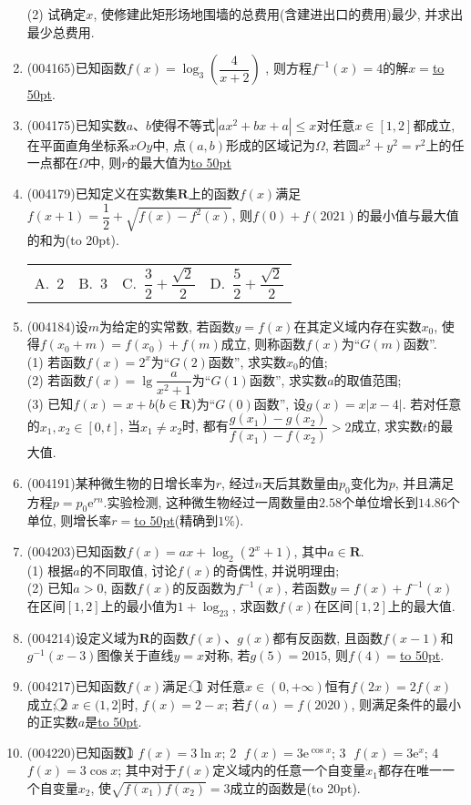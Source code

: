 \documentclass[10pt,a4paper]{article}
\newcommand{\blank}[1]{\underline{\hbox to #1pt{}}}
\newcommand{\bracket}[1]{(\hbox to #1pt{})}
\newcommand{\fourch}[4]{\par\begin{tabular}{p{.23\textwidth}p{.23\textwidth}p{.23\textwidth}p{.23\textwidth}}
A.~#1 &B.~#2& C.~#3& D.~#4
\end{tabular}}
\begin{document}
\begin{enumerate}[1.]
(2) 试确定$x$, 使修建此矩形场地围墙的总费用(含建进出口的费用)最少, 并求出最少总费用.
\item {\tiny (004165)}已知函数$f(x)=\log_3(\dfrac 4{x+2})$ , 则方程$f^{-1}(x)=4$的解$x=$\blank{50}.
\item {\tiny (004175)}已知实数$a$、$b$使得不等式$|ax^2+bx+a|\le x$对任意$x\in [1,2]$都成立, 在平面直角坐标系$xOy$中, 点$(a,b)$形成的区域记为$\Omega$, 若圆$x^2+y^2=r^2$上的任一点都在$\Omega$中, 则$r$的最大值为\blank{50}
\item {\tiny (004179)}已知定义在实数集$\mathbf{R}$上的函数$f(x)$满足$f(x+1)=\dfrac 12+\sqrt{f(x)-f^2(x)}$, 则$f(0)+f(2021)$的最小值与最大值的和为\bracket{20}.
\fourch{$2$}{$3$}{$\dfrac 32+\dfrac{\sqrt 2}2$}{$\dfrac 52+\dfrac{\sqrt 2}2$}
\item {\tiny (004184)}设$m$为给定的实常数, 若函数$y=f(x)$在其定义域内存在实数$x_0$, 使得$f(x_0+m)=f(x_0)+f(m)$成立, 则称函数$f(x)$为``$G(m)$函数''.\\
(1) 若函数$f(x)=2^x$为``$G(2)$函数'', 求实数$x_0$的值;\\
(2) 若函数$f(x)=\lg \dfrac a{x^2+1}$为``$G(1)$函数'', 求实数$a$的取值范围;\\
(3) 已知$f(x)=x+b$($b\in \mathbf{R}$)为``$G(0)$函数'', 设$g(x)=x|x-4|$. 若对任意的$x_1,x_2\in[0,t]$, 当$x_1\ne x_2$时, 都有$\dfrac{g(x_1)-g(x_2)}{f(x_1)-f(x_2)}>2$成立, 求实数$t$的最大值.
\item {\tiny (004191)}某种微生物的日增长率为$r$, 经过$n$天后其数量由$p_0$变化为$p$, 并且满足方程$p=p_0\mathrm{e}^{rn}$.实验检测, 这种微生物经过一周数量由$2.58$个单位增长到$14.86$个单位, 则增长率$r=$\blank{50}(精确到$1\%$).
\item {\tiny (004203)}已知函数$f(x)=ax+\log_2(2^x+1)$, 其中$a\in \mathbf{R}$.\\
(1) 根据$a$的不同取值, 讨论$f(x)$的奇偶性, 并说明理由;\\
(2) 已知$a>0$, 函数$f(x)$的反函数为$f^{-1}(x)$, 若函数$y=f(x)+f^{-1}(x)$在区间$[1,2]$上的最小值为$1+\log_23$, 求函数$f(x)$在区间$[1,2]$上的最大值.
\item {\tiny (004214)}设定义域为$\mathbf{R}$的函数$f(x)$、$g(x)$都有反函数, 且函数$f(x-1)$和$g^{-1}(x-3)$图像关于直线$y=x$对称, 若$g(5)=2015$, 则$f(4)=$\blank{50}.
\item {\tiny (004217)}已知函数$f(x)$满足: \textcircled{1} 对任意$x\in (0,+\infty)$恒有$f(2x)=2f(x)$成立; \textcircled{2} $x\in (1,2]$时, $f(x)=2-x$; 若$f(a)=f(2020)$, 则满足条件的最小的正实数$a$是\blank{50}.
\item {\tiny (004220)}已知函数\textcircled{1} $f(x)=3\ln x$; \textcircled{2} $f(x)=3\mathrm{e}^{\cos x}$; \textcircled{3} $f(x)=3\mathrm{e}^x$; \textcircled{4} $f(x)=3\cos x$; 其中对于$f(x)$定义域内的任意一个自变量$x_1$都存在唯一一个自变量$x_2$, 使$\sqrt{f(x_1)f(x_2)}=3$成立的函数是\bracket{20}.

\end{enumerate}
\end{document}
